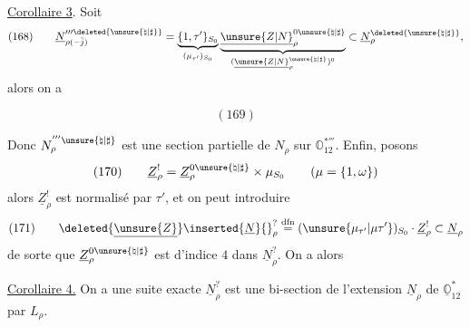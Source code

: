 \uline{Corollaire 3}. Soit
\[
(168)\qquad
\underline N_{\rho(-\bar j)}^{\prime\prime\prime\deleted{\unsure{\natural|\sharp}}}
=\underbrace{\{1,\tau'\}_{S_0}}_{(\mu_{\tau'})_{S_0}}
\underbrace{\underline{\unsure{Z|N}}_\rho^{0\unsure{\natural|\sharp}}}_{(\underline{\unsure{Z|N}}_\rho^{\unsure{\natural|\sharp}})^0}
\subset\underline N_\rho^{\deleted{\unsure{\natural|\sharp}}},
\]
alors on a
\begin{samepage}
\[
(169)
\]
\end{samepage}


Donc \(N_\rho^{'''\unsure{\natural|\sharp}}\) est une section partielle de \(N_\rho\)
sur \(\mathbb O_{12}^{*'''}\). Enfin, posons
\[
(170)\qquad
\underline Z_\rho^{!}
=\underline Z_\rho^{0\unsure{\natural|\sharp}}\times\mu_{S_0}
\qquad(\mu=\{1,\omega\})
\]
alors \(\underline Z_\rho^!\) est normalisé par \(\tau'\), et
on peut introduire
\[
(171)\qquad
\deleted{\underline{\unsure{Z}}}\inserted{\underline N}{}_\rho^{?}
\mathrel{\overset{\mathrm{dfn}}{=}}
(\unsure{\mu_{\tau'}|\mu\tau'})_{S_0}\cdot\underline Z_\rho^!
\subset\underline N_\rho
\]
de sorte que \(\underline Z_\rho^{0\unsure{\natural|\sharp}}\) est d'indice \(4\)
dans \(\underline N_\rho^{?}\). On a alors

\uline{Corollaire 4.} On a une suite exacte
\(\underline N_\rho^{?}\) est une bi-section de l'extension
\(\underline N_\rho\) de \(\underline{\mathbb O}_{12}^{*}\) par \(L_\rho\).

